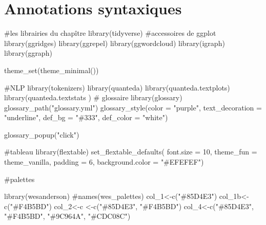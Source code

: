 \documentclass[
  letterpaper,
  DIV=11,
  numbers=noendperiod]{scrreprt}
\newenvironment{Shaded}{\begin{snugshade}}{\end{snugshade}}
\newcommand{\AttributeTok}[1]{\textcolor[rgb]{0.40,0.45,0.13}{#1}}
\newcommand{\CommentTok}[1]{\textcolor[rgb]{0.37,0.37,0.37}{#1}}
\newcommand{\DecValTok}[1]{\textcolor[rgb]{0.68,0.00,0.00}{#1}}
\newcommand{\FunctionTok}[1]{\textcolor[rgb]{0.28,0.35,0.67}{#1}}
\newcommand{\NormalTok}[1]{\textcolor[rgb]{0.00,0.23,0.31}{#1}}
\newcommand{\OtherTok}[1]{\textcolor[rgb]{0.00,0.23,0.31}{#1}}
\newcommand{\StringTok}[1]{\textcolor[rgb]{0.13,0.47,0.30}{#1}}
\begin{document}
\chapter{Annotations syntaxiques}\label{annotations-syntaxiques}

\begin{Shaded}
\begin{Highlighting}[]
\CommentTok{\#les librairies du chapître}
\FunctionTok{library}\NormalTok{(tidyverse)}
\CommentTok{\#accessoires de ggplot}
\FunctionTok{library}\NormalTok{(ggridges)}
\FunctionTok{library}\NormalTok{(ggrepel)}
\FunctionTok{library}\NormalTok{(ggwordcloud)}
\FunctionTok{library}\NormalTok{(igraph)}
\FunctionTok{library}\NormalTok{(ggraph)}

\FunctionTok{theme\_set}\NormalTok{(}\FunctionTok{theme\_minimal}\NormalTok{()) }

\CommentTok{\#NLP}
\FunctionTok{library}\NormalTok{(tokenizers)}
\FunctionTok{library}\NormalTok{(quanteda)}
\FunctionTok{library}\NormalTok{(quanteda.textplots)}
\FunctionTok{library}\NormalTok{(quanteda.textstats )}
\CommentTok{\# glossaire}
\FunctionTok{library}\NormalTok{(glossary)}
\FunctionTok{glossary\_path}\NormalTok{(}\StringTok{"glossary.yml"}\NormalTok{)}
\FunctionTok{glossary\_style}\NormalTok{(}\AttributeTok{color =} \StringTok{"purple"}\NormalTok{, }
               \AttributeTok{text\_decoration =} \StringTok{"underline"}\NormalTok{,}
               \AttributeTok{def\_bg =} \StringTok{"\#333"}\NormalTok{,}
               \AttributeTok{def\_color =} \StringTok{"white"}\NormalTok{)}
\end{Highlighting}
\end{Shaded}

\begin{Shaded}
\begin{Highlighting}[]
\FunctionTok{glossary\_popup}\NormalTok{(}\StringTok{"click"}\NormalTok{)}

\CommentTok{\#tableau}
\FunctionTok{library}\NormalTok{(flextable)}
\FunctionTok{set\_flextable\_defaults}\NormalTok{(}
  \AttributeTok{font.size =} \DecValTok{10}\NormalTok{, }\AttributeTok{theme\_fun =}\NormalTok{ theme\_vanilla,}
  \AttributeTok{padding =} \DecValTok{6}\NormalTok{,}
  \AttributeTok{background.color =} \StringTok{"\#EFEFEF"}\NormalTok{)}

\CommentTok{\#palettes}

\FunctionTok{library}\NormalTok{(wesanderson)}
\CommentTok{\#names(wes\_palettes)}
\NormalTok{col\_1}\OtherTok{\textless{}{-}}\FunctionTok{c}\NormalTok{(}\StringTok{"\#85D4E3"}\NormalTok{)}
\NormalTok{col\_1b}\OtherTok{\textless{}{-}}\FunctionTok{c}\NormalTok{(}\StringTok{"\#F4B5BD"}\NormalTok{)}
\NormalTok{col\_2}\OtherTok{\textless{}{-}}\NormalTok{c }\OtherTok{\textless{}{-}}\FunctionTok{c}\NormalTok{(}\StringTok{"\#85D4E3"}\NormalTok{, }\StringTok{"\#F4B5BD"}\NormalTok{)}
\NormalTok{col\_4}\OtherTok{\textless{}{-}}\FunctionTok{c}\NormalTok{(}\StringTok{"\#85D4E3"}\NormalTok{, }\StringTok{"\#F4B5BD"}\NormalTok{, }\StringTok{"\#9C964A"}\NormalTok{, }\StringTok{"\#CDC08C"}\NormalTok{)}
\end{Highlighting}
\end{Shaded}
\end{document}

